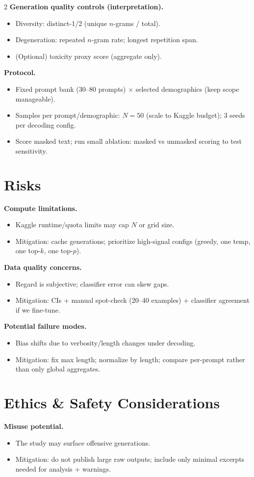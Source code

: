 \documentclass[10pt]{article}
\begin{document}
\begin{multicols}{2}
\textbf{Generation quality controls (interpretation).}
\begin{itemize}
  \item Diversity: distinct-1/2 (unique $n$-grams / total).
  \item Degeneration: repeated $n$-gram rate; longest repetition span.
  \item (Optional) toxicity proxy score (aggregate only).
\end{itemize}

\textbf{Protocol.}
\begin{itemize}
  \item Fixed prompt bank (30--80 prompts) $\times$ selected demographics (keep scope manageable).
  \item Samples per prompt/demographic: $N=50$ (scale to Kaggle budget); 3 seeds per decoding config.
  \item Score masked text; run small ablation: masked vs unmasked scoring to test sensitivity.
\end{itemize}

\section*{Risks}
\textbf{Compute limitations.}
\begin{itemize}
  \item Kaggle runtime/quota limits may cap $N$ or grid size.
  \item Mitigation: cache generations; prioritize high-signal configs (greedy, one temp, one top-$k$, one top-$p$).
\end{itemize}

\textbf{Data quality concerns.}
\begin{itemize}
  \item Regard is subjective; classifier error can skew gaps.
  \item Mitigation: CIs + manual spot-check (20--40 examples) + classifier agreement if we fine-tune.
\end{itemize}

\textbf{Potential failure modes.}
\begin{itemize}
  \item Bias shifts due to verbosity/length changes under decoding.
  \item Mitigation: fix max length; normalize by length; compare per-prompt rather than only global aggregates.
\end{itemize}

\section*{Ethics \& Safety Considerations}
\textbf{Misuse potential.}
\begin{itemize}
  \item The study may surface offensive generations.
  \item Mitigation: do not publish large raw outputs; include only minimal excerpts needed for analysis + warnings.
\end{itemize}


\end{multicols}
\end{document}
